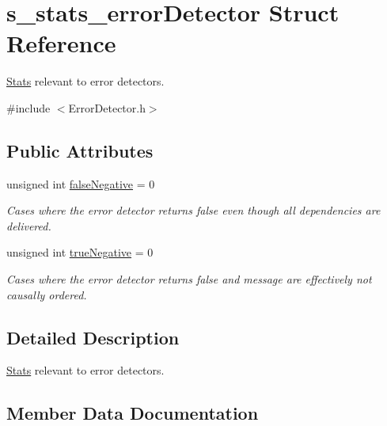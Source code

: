 \hypertarget{structs__stats__error_detector}{}\section{s\+\_\+stats\+\_\+error\+Detector Struct Reference}
\label{structs__stats__error_detector}


\hyperlink{class_stats}{Stats} relevant to error detectors.  




{\ttfamily \#include $<$Error\+Detector.\+h$>$}

\subsection*{Public Attributes}
\begin{DoxyCompactItemize}
\item 
unsigned int \hyperlink{structs__stats__error_detector_a612288d77cf4bd7c6244474fb738768d}{false\+Negative} = 0
\begin{DoxyCompactList}\small\item\em Cases where the error detector returns false even though all dependencies are delivered. \end{DoxyCompactList}\item 
unsigned int \hyperlink{structs__stats__error_detector_ad37aeef79761af921bb44f31024c78ce}{true\+Negative} = 0
\begin{DoxyCompactList}\small\item\em Cases where the error detector returns false and message are effectively not causally ordered. \end{DoxyCompactList}\end{DoxyCompactItemize}


\subsection{Detailed Description}
\hyperlink{class_stats}{Stats} relevant to error detectors. 



\subsection{Member Data Documentation}
\mbox{\label{structs__stats__error_detector_a612288d77cf4bd7c6244474fb738768d}} 
